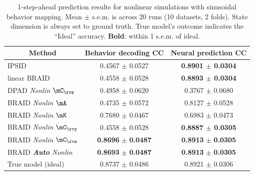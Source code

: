 \documentclass{article} %
\newcommand{\ourmethod}{BRAID}
\newcommand{\ourmethodlinear}{linear \ourmethod}
\begin{document}
\begin{table}[h]
\baselineskip
\caption{1-step-ahead prediction results for nonlinear simulations with sinusoidal behavior mapping. Mean \(\pm\) s.e.m. is across 20 runs (10 datasets, 2 folds). State dimension is always set to ground truth. True model's outcome indicates the ``Ideal'' accuracy. \textbf{Bold}: within 1 s.e.m. of ideal.}
\label{tab: simTable}
\begin{center}
\begin{tabular}{l|c|c}
\multicolumn{1}{c|}{\textbf{Method}} & \multicolumn{1}{c|}{\textbf{Behavior decoding CC}} & \multicolumn{1}{c}{\textbf{Neural prediction CC}} \\
\midrule
IPSID & 0.4567 \(\pm\) 0.0527  & \textbf{0.8901 \(\pm\) 0.0304}\\
\ourmethodlinear{} & 0.4558 \(\pm\) 0.0528  & \textbf{0.8893 \(\pm\) 0.0304}\\
DPAD \textit{Nonlin} \(\mC_\rvz\) & 0.4958 \(\pm\) 0.0620 & 0.3767  \(\pm\) 0.0680\\
\ourmethod{} \textit{Nonlin} \(\mA\) & 0.4735 \(\pm\) 0.0572 & 0.8127 \(\pm\) 0.0528\\
\ourmethod{} \textit{Nonlin} \(\mK\) & 0.7680 \(\pm\) 0.0467 & 0.6983 \(\pm\) 0.0473\\
\ourmethod{} \textit{Nonlin} \(\mC_\rvy\) & 0.4558 \(\pm\) 0.0528 & \textbf{0.8887 \(\pm\) 0.0305}\\
\ourmethod{} \textit{Nonlin} \(\mC_\rvz\) & \textbf{0.8696} \(\pm\) \textbf{0.0487} & \textbf{0.8913} \(\pm\) \textbf{0.0305}\\
\ourmethod{} \textit{\textbf{Auto} Nonlin} & \textbf{0.8693} \(\pm\) \textbf{0.0487} &  \textbf{0.8913} \(\pm\) \textbf{0.0305}\\
\midrule
True model (ideal) & 0.8737 \(\pm\) 0.0486 &  0.8921 \(\pm\) 0.0306\\
\end{tabular}
\end{center}
\baselineskip
\end{table}
\end{document}
